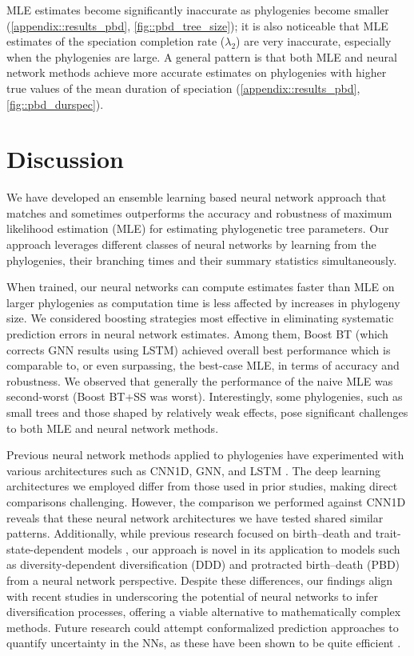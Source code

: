 {MLE estimates become significantly inaccurate as phylogenies become smaller (\autoref{appendix::results_pbd}, \autoref{fig::pbd_tree_size}); it is also noticeable that MLE estimates of the speciation completion rate ($\lambda_2$) are very inaccurate, especially when the phylogenies are large. A general pattern is that both MLE and neural network methods achieve more accurate estimates on phylogenies with higher true values of the mean duration of speciation (\autoref{appendix::results_pbd}, \autoref{fig::pbd_durspec}).

\bigskip
\section{Discussion}
\label{ch2::sec::discussion}
We have developed an ensemble learning based neural network approach that matches and sometimes outperforms the accuracy and robustness of maximum likelihood estimation (MLE) for estimating phylogenetic tree parameters. Our approach leverages different classes of neural networks by learning from the phylogenies, their branching times and their summary statistics simultaneously. 

When trained, our neural networks can compute estimates faster than MLE on larger phylogenies as computation time is less affected by increases in phylogeny size. We considered boosting strategies most effective in eliminating systematic prediction errors in neural network estimates. Among them, Boost BT (which corrects GNN results using LSTM) achieved overall best performance which is comparable to, or even surpassing, the best-case MLE, in terms of accuracy and robustness. We observed that generally the performance of the naive MLE was second-worst (Boost BT+SS was worst). Interestingly, some phylogenies, such as small trees and those shaped by relatively weak effects, pose significant challenges to both MLE and neural network methods.

Previous neural network methods applied to phylogenies have experimented with various architectures such as CNN1D, GNN, and LSTM \citep{lajaaiti_comparison_2023, voznica_deep_2022, lambert_deep_2023}. The deep learning architectures we employed differ from those used in prior studies, making direct comparisons challenging. However, the comparison we performed against CNN1D reveals that these neural network architectures we have tested shared similar patterns. Additionally, while previous research focused on birth--death \citep{lambert_deep_2023} and trait-state-dependent models \citep{lajaaiti_comparison_2023, thompson_deep_2024}, our approach is novel in its application to models such as diversity-dependent diversification (DDD) and protracted birth--death (PBD) from a neural network perspective. Despite these differences, our findings align with recent studies in underscoring the potential of neural networks to infer diversification processes, offering a viable alternative to mathematically complex methods. Future research could attempt conformalized prediction approaches to quantify uncertainty in the NNs, as these have been shown to be quite efficient \citep{romano2019conformalized}.

}

